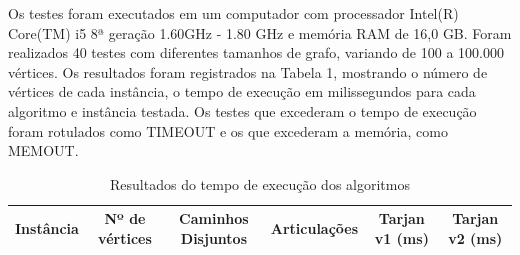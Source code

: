 Os testes foram executados em um computador com processador Intel(R) Core(TM) i5 8ª geração 1.60GHz - 1.80 GHz e memória RAM de 16,0 GB. Foram realizados 40 testes com diferentes tamanhos de grafo, variando de 100 a 100.000 vértices. Os resultados foram registrados na Tabela 1, mostrando o número de vértices de cada instância, o tempo de execução em milissegundos para cada algoritmo e instância testada. Os testes que excederam o tempo de execução foram rotulados como TIMEOUT e os que excederam a memória, como MEMOUT. 



\begin{table}[htb]
	\centering
	\caption{\hspace{0.1cm} Resultados do tempo de execução dos algoritmos}
	\vspace{-0.3cm} %
	\label{tab:tabela1}
	\begin{tabular}{c|c|c|c|c|c}
  \hline
    \textbf{Instância}	& \textbf{Nº de vértices} & \textbf{Caminhos Disjuntos} & \textbf{Articulações} & \textbf{Tarjan v1 (ms)} & \textbf{Tarjan v2 (ms)} \\
    \hline


\end{tabular}
\end{table}
